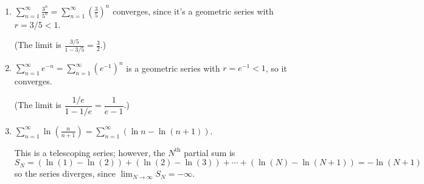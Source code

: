 \documentclass[12pt]{article}
\newcommand{\di}{\displaystyle}
\begin{document}
\begin{enumerate}
\begin{enumerate}
 \item $\di \sum_{n=1}^\infty \frac{3^n}{5^n} = \sum_{n=1}^\infty \left(\frac35\right)^n$ converges, since it's a geometric series with $r=3/5<1$.
 
 (The limit is $\frac{3/5}{1-3/5} = \frac{3}{2}$.)


 \item $\di \sum_{n=1}^\infty e^{-n} = \sum_{n=1}^\infty (e^{-1})^n$ is a geometric series with $r=e^{-1}<1$, so it converges.
 
 (The limit is $\dfrac{1/e}{1-1/e} = \dfrac{1}{e-1}$.) 
 
 
 
 \item $\di \sum_{n=1}^\infty \ln\left(\frac{n}{n+1}\right) = \sum_{n=1}^\infty(\ln n - \ln(n+1))$.
 
 This is a telescoping series; however, the $N^{\text{th}}$ partial sum is
 \[
 S_N = (\ln(1)-\ln(2))+(\ln(2)-\ln(3))+\cdots + (\ln(N)-\ln(N+1)) = -\ln(N+1) 
 \]
 so the series diverges, since $\lim_{N\to\infty}S_N = -\infty$.
\end{enumerate}
\end{enumerate}
\end{document}
